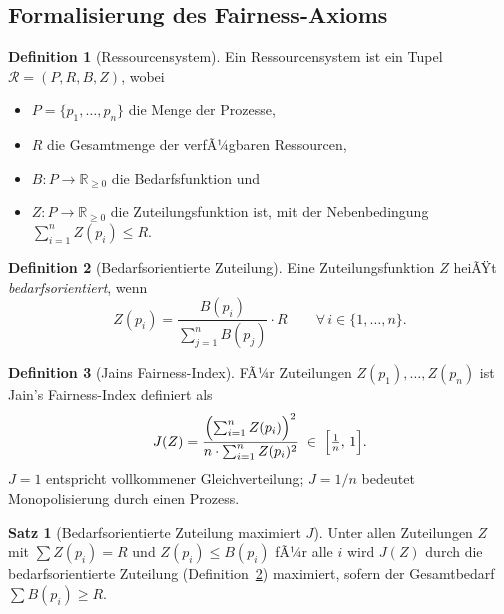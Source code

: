 ﻿\documentclass[a4paper,12pt]{article}
\theoremstyle{definition}
\newtheorem{definition}{Definition}
\newtheorem{satz}{Satz}
\begin{document}
\subsection{Formalisierung des Fairness-Axioms}

\begin{definition}[Ressourcensystem]
Ein Ressourcensystem ist ein Tupel $\mathcal{R} = (P, R, B, Z)$, wobei
\begin{itemize}
  \item $P = \{p_1, \ldots, p_n\}$ die Menge der Prozesse,
  \item $R$ die Gesamtmenge der verfÃ¼gbaren Ressourcen,
  \item $B: P \to \mathbb{R}_{\geq 0}$ die Bedarfsfunktion und
  \item $Z: P \to \mathbb{R}_{\geq 0}$ die Zuteilungsfunktion ist,
        mit der Nebenbedingung $\sum_{i=1}^n Z(p_i) \leq R$.
\end{itemize}
\end{definition}

\begin{definition}[Bedarfsorientierte Zuteilung]
\label{def:bod}
Eine Zuteilungsfunktion $Z$ heiÃŸt \emph{bedarfsorientiert}, wenn
\[
  Z(p_i) = \frac{B(p_i)}{\sum_{j=1}^n B(p_j)} \cdot R
  \qquad \forall\, i \in \{1, \ldots, n\}.
\]
\end{definition}

\begin{definition}[Jains Fairness-Index]
\label{def:jain}
FÃ¼r Zuteilungen $Z(p_1), \ldots, Z(p_n)$ ist Jain's Fairness-Index
\cite{jain1984quantitative} definiert als
\[
  J(Z) = \frac{\Bigl(\sum_{i=1}^n Z(p_i)\Bigr)^2}
              {n \cdot \sum_{i=1}^n Z(p_i)^2}
  \;\in\; \Bigl[\tfrac{1}{n},\, 1\Bigr].
\]
$J = 1$ entspricht vollkommener Gleichverteilung;
$J = 1/n$ bedeutet Monopolisierung durch einen Prozess.
\end{definition}

\begin{satz}[Bedarfsorientierte Zuteilung maximiert $J$]
\label{satz:jain_max}
Unter allen Zuteilungen $Z$ mit $\sum Z(p_i) = R$ und
$Z(p_i) \leq B(p_i)$ fÃ¼r alle $i$ wird $J(Z)$ durch die
bedarfsorientierte Zuteilung (Definition~\ref{def:bod}) maximiert,
sofern der Gesamtbedarf $\sum B(p_i) \geq R$.
\end{satz}
\end{document}
